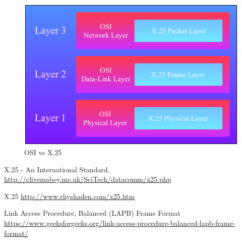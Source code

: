 \begin{figure}[ht!]
\centering
\includegraphics[scale=0.9]{Imagenes/x25layer.pdf}
\caption{OSI vs X.25}
\end{figure}



\begin{thebibliography}{9}

X.25 - An International Standard. \href{http://clivemabey.me.uk/SciTech/datacomm/x25.php}{http://clivemabey.me.uk/SciTech/datacomm/x25.php}


X.25 \href{http://www.rhyshaden.com/x25.htm}{http://www.rhyshaden.com/x25.htm}

Link Access Procedure, Balanced (LAPB) Frame Format \href{https://www.geeksforgeeks.org/link-access-procedure-balanced-lapb-frame-format/}{https://www.geeksforgeeks.org/link-access-procedure-balanced-lapb-frame-format/}

\end{thebibliography}

